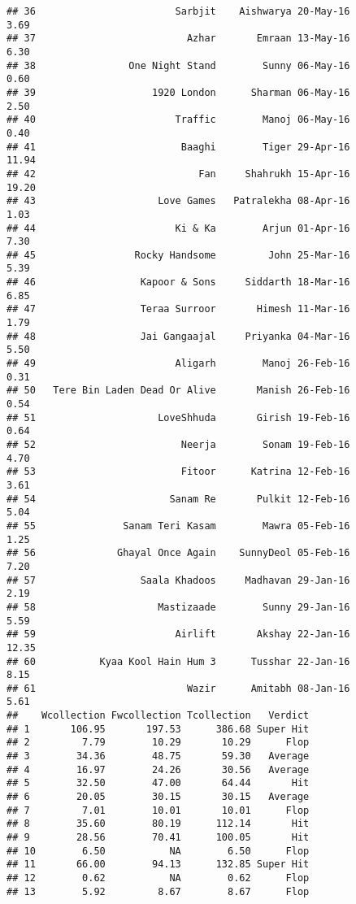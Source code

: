 \documentclass[
]{article}
\begin{document}
\begin{verbatim}
## 36                        Sarbjit    Aishwarya 20-May-16        3.69
## 37                          Azhar       Emraan 13-May-16        6.30
## 38                One Night Stand        Sunny 06-May-16        0.60
## 39                    1920 London      Sharman 06-May-16        2.50
## 40                        Traffic        Manoj 06-May-16        0.40
## 41                         Baaghi        Tiger 29-Apr-16       11.94
## 42                            Fan     Shahrukh 15-Apr-16       19.20
## 43                     Love Games   Patralekha 08-Apr-16        1.03
## 44                        Ki & Ka        Arjun 01-Apr-16        7.30
## 45                 Rocky Handsome         John 25-Mar-16        5.39
## 46                  Kapoor & Sons     Siddarth 18-Mar-16        6.85
## 47                  Teraa Surroor       Himesh 11-Mar-16        1.79
## 48                  Jai Gangaajal     Priyanka 04-Mar-16        5.50
## 49                        Aligarh        Manoj 26-Feb-16        0.31
## 50   Tere Bin Laden Dead Or Alive       Manish 26-Feb-16        0.54
## 51                     LoveShhuda       Girish 19-Feb-16        0.64
## 52                         Neerja        Sonam 19-Feb-16        4.70
## 53                         Fitoor      Katrina 12-Feb-16        3.61
## 54                       Sanam Re       Pulkit 12-Feb-16        5.04
## 55               Sanam Teri Kasam        Mawra 05-Feb-16        1.25
## 56              Ghayal Once Again    SunnyDeol 05-Feb-16        7.20
## 57                  Saala Khadoos     Madhavan 29-Jan-16        2.19
## 58                     Mastizaade        Sunny 29-Jan-16        5.59
## 59                        Airlift       Akshay 22-Jan-16       12.35
## 60           Kyaa Kool Hain Hum 3      Tusshar 22-Jan-16        8.15
## 61                          Wazir      Amitabh 08-Jan-16        5.61
##    Wcollection Fwcollection Tcollection   Verdict
## 1       106.95       197.53      386.68 Super Hit
## 2         7.79        10.29       10.29      Flop
## 3        34.36        48.75       59.30   Average
## 4        16.97        24.26       30.56   Average
## 5        32.50        47.00       64.44       Hit
## 6        20.05        30.15       30.15   Average
## 7         7.01        10.01       10.01      Flop
## 8        35.60        80.19      112.14       Hit
## 9        28.56        70.41      100.05       Hit
## 10        6.50           NA        6.50      Flop
## 11       66.00        94.13      132.85 Super Hit
## 12        0.62           NA        0.62      Flop
## 13        5.92         8.67        8.67      Flop

\end{verbatim}
\end{document}
